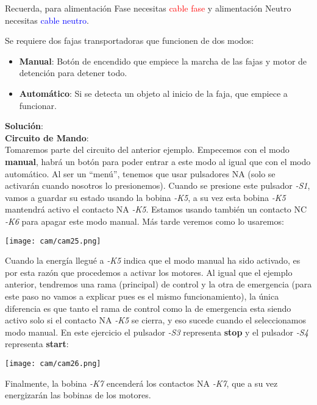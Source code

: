 \documentclass[
	12pt, %
	fleqn, %
	a4paper, %
	oneside, %
]{LegrandOrangeBook}
\begin{document}
\begin{remark}
Recuerda, para alimentación Fase necesitas \textcolor{red}{cable fase} y alimentación Neutro necesitas \textcolor{blue}{cable neutro}.
\end{remark}
\begin{example}
Se requiere dos fajas transportadoras que funcionen de dos modos:
\begin{itemize}
\item \textbf{Manual}: Botón de encendido que empiece la marcha de las fajas y motor de detención para detener todo.
\item \textbf{Automático}: Si se detecta un objeto al inicio de la faja, que empiece a funcionar.
\end{itemize}
\textbf{Solución}:\\
\textbf{Circuito de Mando}:\\
Tomaremos parte del circuito del anterior ejemplo. Empecemos con el modo \textbf{manual}, habrá un botón para poder entrar a este modo al igual que con el modo automático. Al ser un ``menú'', tenemos que usar pulsadores NA (solo se activarán cuando nosotros lo presionemos). Cuando se presione este pulsador \textit{-S1}, vamos a guardar su estado usando la bobina \textit{-K5}, a su vez esta bobina \textit{-K5} mantendrá activo el contacto NA \textit{-K5}. Estamos usando también un contacto NC \textit{-K6} para apagar este modo manual. Más tarde veremos como lo usaremos:\\
\begin{center}
\texttt{[image: cam/cam25.png]}
\end{center}
Cuando la energía llegué a \textit{-K5} indica que el modo manual ha sido activado, es por esta razón que procedemos a activar los motores. Al igual que el ejemplo anterior, tendremos una rama (principal) de control y la otra de emergencia (para este paso no vamos a explicar pues es el mismo funcionamiento), la única diferencia es que tanto el rama de control como la de emergencia esta siendo activo solo si el contacto NA \textit{-K5} se cierra, y eso sucede cuando el seleccionamos modo manual. En este ejercicio el pulsador \textit{-S3} representa \textbf{stop} y el pulsador \textit{-S4} representa \textbf{start}:
\begin{center}
\texttt{[image: cam/cam26.png]}
\end{center}
Finalmente, la bobina \textit{-K7} encenderá los contactos NA \textit{-K7}, que a su vez energizarán las bobinas de los motores.

\end{example}
\end{document}
